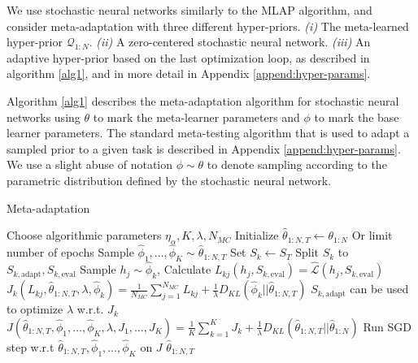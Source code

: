 \documentclass{article} %
\theoremstyle{definition}
\begin{document}
We use stochastic neural networks \citep{Graves2011, Blundell2015} similarly to the MLAP \citep{Amit2018} algorithm, and consider meta-adaptation with three different hyper-priors. \emph{(i)} The meta-learned hyper-prior $\mathcal{Q}_{1:N}$. \emph{(ii)} A zero-centered stochastic neural network. \emph{(iii)}  An adaptive hyper-prior based on the last optimization loop, as described in algorithm \ref{alg1}, and in more detail in Appendix \ref{append:hyper-params}. 

Algorithm \ref{alg1} describes the meta-adaptation algorithm for stochastic neural networks using $\theta$ to mark the meta-learner parameters and $\phi$ to mark the base learner parameters. The standard meta-testing algorithm that is used to adapt a sampled prior to a given task is described in Appendix \ref{append:hyper-params}. We use a slight abuse of notation $\phi\sim \theta$ to denote sampling according to the parametric distribution defined by the stochastic neural network.

\begin{algorithm}[H]
	\caption{Meta-adaptation}
	\label{alg1}
	\small
	\begin{algorithmic}
		\State Choose algorithmic parameters $\eta_\alpha, K, \lambda, N_{MC}$
		\State Initialize $\hat{\theta}_{1:N, T}\leftarrow \theta_{1:N}$
		 \Comment Or limit number of epochs
		\State Sample $\hat{\phi}_1,\ldots,\hat{\phi}_K\sim \hat{\theta}_{1:N, T}$
		\State Set $S_k\leftarrow S_T$
		\State Split $S_k$ to $S_{k,\mathrm{adapt}},S_{k,\mathrm{eval}}$
		\State Sample $h_j\sim \hat{\phi}_k$, 
		\State Calculate $L_{kj}(h_j, S_{k,\mathrm{eval}})=\hat{\mathcal{L}}(h_j,S_{k,\mathrm{eval}})$
		\EndFor 
		\State $J_k(L_{kj}, \hat{\theta}_{1:N, T}, \lambda,\hat{\phi}_k )=\frac{1}{N_{MC}}\sum_{j=1}^{N_{MC}}L_{kj}+\frac{1}{\lambda} D_{KL}(\hat{\phi}_k||\hat{\theta}_{1:N,T})$ \Comment $S_{k,\mathrm{adapt}}$ can be used to optimize $\lambda$ w.r.t. $J_k$
		\EndFor
		\State $J(\hat{\theta}_{1:N,T}, \hat{\phi}_1,\ldots,\hat{\phi}_K, \lambda, J_1,\ldots,J_K)=\frac{1}{K}\sum_{k=1}^{K}J_k + \frac{1}{\lambda} D_{KL}(\hat{\theta}_{1:N, T}||\hat{\theta}_{1:N})$
		\State  Run SGD step w.r.t $\hat{\theta}_{1:N, T},\hat{\phi}_1,\ldots,\hat{\phi}_K$ on $J$
		\EndWhile
		\State \Return $\hat{\theta}_{1:N, T}$
		\EndFunction
	\end{algorithmic}
\end{algorithm}
\end{document}
